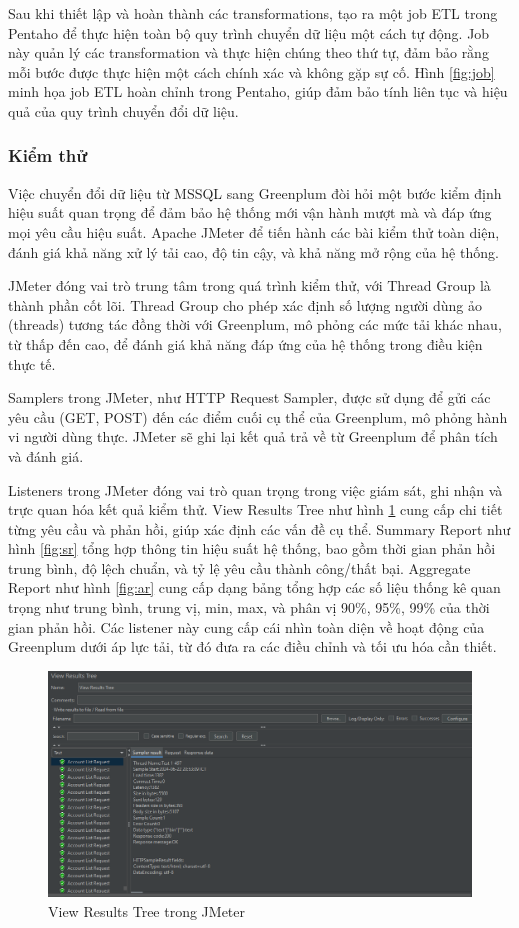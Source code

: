 \documentclass[14pt]{article}
\begin{document}
Sau khi thiết lập và hoàn thành các transformations, 
 tạo ra một job ETL trong Pentaho để thực hiện toàn bộ quy trình chuyển dữ liệu một cách tự động. Job này quản lý các transformation và thực hiện chúng theo thứ tự, đảm bảo rằng mỗi bước được thực hiện một cách chính xác và không gặp sự cố. Hình \ref{fig:job} minh họa job ETL hoàn chỉnh trong Pentaho, giúp đảm bảo tính liên tục và hiệu quả của quy trình chuyển đổi dữ liệu.




\subsubsection{Kiểm thử}

Việc chuyển đổi dữ liệu từ MSSQL sang Greenplum đòi hỏi một bước kiểm định hiệu suất quan trọng để đảm bảo hệ thống mới vận hành mượt mà và đáp ứng mọi yêu cầu hiệu suất. Apache JMeter để tiến hành các bài kiểm thử toàn diện, đánh giá khả năng xử lý tải cao, độ tin cậy, và khả năng mở rộng của hệ thống.

JMeter đóng vai trò trung tâm trong quá trình kiểm thử, với Thread Group là thành phần cốt lõi. Thread Group cho phép xác định số lượng người dùng ảo (threads) tương tác đồng thời với Greenplum, mô phỏng các mức tải khác nhau, từ thấp đến cao, để đánh giá khả năng đáp ứng của hệ thống trong điều kiện thực tế.

Samplers trong JMeter, như HTTP Request Sampler, được sử dụng để gửi các yêu cầu (GET, POST) đến các điểm cuối cụ thể của Greenplum, mô phỏng hành vi người dùng thực. JMeter sẽ ghi lại kết quả trả về từ Greenplum để phân tích và đánh giá.

Listeners trong JMeter đóng vai trò quan trọng trong việc giám sát, ghi nhận và trực quan hóa kết quả kiểm thử. View Results Tree như hình \ref{fig:vrt} cung cấp chi tiết từng yêu cầu và phản hồi, giúp xác định các vấn đề cụ thể. Summary Report như hình \ref{fig:sr} tổng hợp thông tin hiệu suất hệ thống, bao gồm thời gian phản hồi trung bình, độ lệch chuẩn, và tỷ lệ yêu cầu thành công/thất bại. Aggregate Report như hình \ref{fig:ar} cung cấp dạng bảng tổng hợp các số liệu thống kê quan trọng như trung bình, trung vị, min, max, và phân vị 90\%, 95\%, 99\% của thời gian phản hồi. Các listener này cung cấp cái nhìn toàn diện về hoạt động của Greenplum dưới áp lực tải, từ đó đưa ra các điều chỉnh và tối ưu hóa cần thiết.

\begin{figure}
    \centering
    \includegraphics[width=0.8\linewidth]{images/vrt.png}
    \caption{View Results Tree trong JMeter}
    \label{fig:vrt}
\end{figure}
\end{document}
